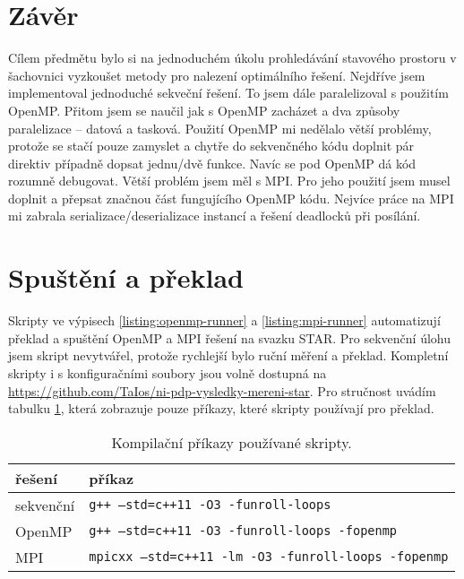 \documentclass{article}
\newcommand{\const}[1]{\texttt{#1}}
\begin{document}
    \section{Závěr}

    Cílem předmětu bylo si na jednoduchém úkolu prohledávání stavového prostoru v šachovnici vyzkoušet metody pro
    nalezení optimálního řešení. Nejdříve jsem implementoval jednoduché sekveční řešení. To jsem dále paralelizoval
    s použitím OpenMP. Přitom jsem se naučil jak s OpenMP zacházet a dva způsoby paralelizace – datová a tasková.
    Použití OpenMP mi nedělalo větší problémy, protože se stačí pouze zamyslet a chytře do sekvenčného kódu doplnit
    pár direktiv případně dopsat jednu/dvě funkce. Navíc se pod OpenMP dá kód rozumně debugovat. Větší problém jsem
    měl s MPI. Pro jeho použití jsem musel doplnit a přepsat značnou část fungujícího OpenMP kódu. Nejvíce práce na
    MPI mi zabrala serializace/deserializace instancí a řešení deadlocků při posílání.

    \newpage
    \section{Spuštění a překlad}
    Skripty ve výpisech \ref{listing:openmp-runner} a \ref{listing:mpi-runner}  automatizují překlad a spuštění OpenMP a MPI řešení na svazku STAR.
    Pro sekvenční úlohu jsem skript nevytvářel, protože rychlejší bylo ruční měření a překlad. Kompletní
    skripty i s konfiguračními soubory jsou volně dostupná na \url{https://github.com/TaIos/ni-pdp-vysledky-mereni-star}.
    Pro stručnost uvádím tabulku \ref{tab:compilation-short}, která zobrazuje pouze příkazy, které skripty používají pro překlad.

    \begin{table}[ht]
        \centering
        \begin{tabular}{|l|l|}
            \hline
            \textbf{řešení}    & \textbf{příkaz}                                      \\ \hline
            sekvenční & \const{g++ --std=c++11 -O3 -funroll-loops}          \\ \hline
            OpenMP    & \const{g++ --std=c++11 -O3 -funroll-loops -fopenmp} \\ \hline
            MPI       & \const{mpicxx --std=c++11 -lm -O3 -funroll-loops -fopenmp}   \\ \hline
        \end{tabular}
        \caption{Kompilační příkazy používané skripty.}
        \label{tab:compilation-short}
    \end{table}
\end{document}
